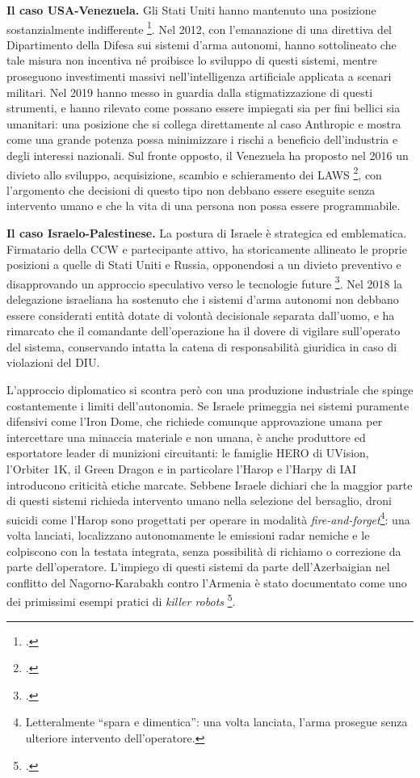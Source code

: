\ifstampa\documentclass[a4paper,12pt,twoside,openright]{report}\else\documentclass[a4paper,12pt]{report}\fi
\newif\ifrevisione \revisionefalse
\DeclareRobustCommand{\rev}[1]{\ifrevisione{\color{blue!65!black}#1}\else#1\fi}
\begin{document}
\textbf{Il caso USA-Venezuela.}
Gli Stati Uniti hanno mantenuto una posizione sostanzialmente indifferente
\footcite[p.~52]{wareham_2020}. Nel
2012, \rev{con l'emanazione di una direttiva del Dipartimento della Difesa sui
sistemi d'arma autonomi}, hanno sottolineato che tale misura non incentiva né proibisce lo
sviluppo di questi sistemi, mentre proseguono investimenti massivi
nell'intelligenza artificiale applicata a scenari militari. Nel 2019 hanno messo
in guardia dalla stigmatizzazione di questi strumenti, e hanno rilevato come
possano essere impiegati sia per fini bellici sia umanitari: una posizione che
si collega direttamente al caso Anthropic e mostra come una grande potenza possa
minimizzare i rischi a beneficio dell'industria e degli interessi nazionali. Sul
fronte opposto, il Venezuela ha proposto nel 2016 un divieto allo sviluppo,
acquisizione, scambio e schieramento dei LAWS \footcite[p.~53]{wareham_2020}, con l'argomento che decisioni di
questo tipo non debbano essere eseguite senza intervento umano e che la vita di
una persona non possa essere programmabile.
 
\textbf{Il caso Israelo-Palestinese.}
La postura di Israele è strategica ed emblematica. Firmatario della CCW e
partecipante attivo, ha storicamente allineato le proprie posizioni a quelle di
Stati Uniti e Russia, opponendosi a un divieto preventivo e disapprovando un
approccio speculativo verso le tecnologie future \footcite{antebi_2018}. Nel
2018 la delegazione israeliana ha sostenuto che i sistemi d'arma autonomi non
debbano essere considerati entità dotate di volontà decisionale separata
dall'uomo, e ha rimarcato che il comandante dell'operazione ha il dovere di
vigilare sull'operato del sistema, conservando intatta la catena di
responsabilità giuridica in caso di violazioni del DIU.
 
L'approccio diplomatico si scontra però con una produzione industriale che
spinge costantemente i limiti dell'autonomia. Se Israele primeggia nei sistemi
puramente difensivi come l'Iron Dome, che richiede comunque approvazione umana
per intercettare una minaccia materiale e non umana, è anche produttore ed
esportatore leader di munizioni \rev{circuitanti}: le famiglie HERO di UVision, l'Orbiter
1K, il Green Dragon e in particolare l'Harop e l'Harpy di IAI introducono
criticità etiche marcate. Sebbene Israele dichiari che la maggior parte di
questi sistemi richieda intervento umano nella selezione del bersaglio, droni
suicidi come l'Harop sono progettati per operare in modalità
\textit{fire-and-forget}\footnote{Letteralmente ``spara e dimentica'': una volta
lanciata, l'arma prosegue senza ulteriore intervento dell'operatore.}: una volta
lanciati, localizzano autonomamente le emissioni radar nemiche e le colpiscono
con la testata integrata, senza possibilità di richiamo o correzione da parte
dell'operatore. L'impiego di questi sistemi da parte dell'Azerbaigian nel conflitto
del Nagorno-Karabakh contro l'Armenia è stato documentato come uno dei
primissimi esempi pratici di \textit{killer robots} \footcite{antebi_2018}.
 
\end{document}
